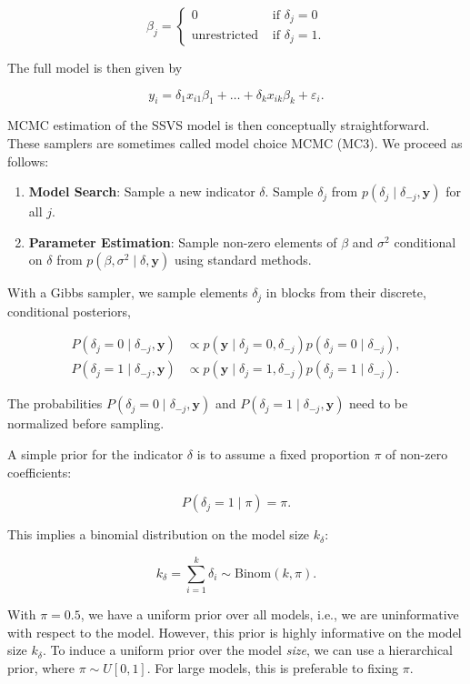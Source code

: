 \[
	\beta_j = 
	\begin{cases}
		0 & \text{ if } \delta_j = 0 \\
		\text{unrestricted} & \text{ if } \delta_j = 1.
	\end{cases}
\]

The full model is then given by

\[
	y_i = \delta_1 x_{i1}\beta_1 + \dots + \delta_k x_{ik}\beta_k + \varepsilon_i.
\]

MCMC estimation of the SSVS model is then conceptually straightforward. These samplers are sometimes called model choice MCMC (MC3). We proceed as follows:

\begin{enumerate}
	\item \textbf{Model Search}: Sample a new indicator $\delta$. Sample $\delta_j$ from $p(\delta_j\mid\delta_{-j},\bm{y})$ for all $j$. 
	\item \textbf{Parameter Estimation}: Sample non-zero elements of $\beta$ and $\sigma^2$ conditional on $\delta$ from $p(\beta,\sigma^2\mid\delta,\bm{y})$ using standard methods. 
\end{enumerate}

With a Gibbs sampler, we sample elements $\delta_j$ in blocks from their discrete, conditional posteriors,

\begin{align*}
	P(\delta_j = 0 \mid \delta_{-j},\bm{y}) &\propto p(\bm{y}\mid\delta_j = 0, \delta_{-j})p(\delta_j = 0\mid \delta_{-j}), \\
	P(\delta_j = 1 \mid \delta_{-j},\bm{y}) &\propto p(\bm{y}\mid\delta_j = 1, \delta_{-j})p(\delta_j = 1\mid \delta_{-j}).
\end{align*}

The probabilities $P(\delta_j = 0 \mid \delta_{-j},\bm{y})$ and $P(\delta_j = 1 \mid \delta_{-j},\bm{y})$ need to be normalized before sampling. 

A simple prior for the indicator $\delta$ is to assume a fixed proportion $\pi$ of non-zero coefficients:

\[
	P(\delta_j = 1 \mid \pi) = \pi.
\]

This implies a binomial distribution on the model size $k_\delta$:

\[
	k_\delta = \sum^k_{i=1}\delta_i\sim\mathrm{Binom}(k,\pi).
\]

With $\pi = 0.5$, we have a uniform prior over all models, i.e., we are uninformative with respect to the model. However, this prior is highly informative on the model size $k_\delta$. To induce a uniform prior over the model \textit{size}, we can use a hierarchical prior, where $\pi \sim U[0,1]$. For large models, this is preferable to fixing $\pi$. 

